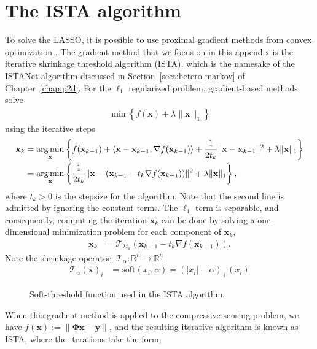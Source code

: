 \section{The ISTA algorithm}
To solve the LASSO, it is possible to use proximal gradient methods from convex optimization \cite{ref:beck2009fast}. The gradient method that we focus on in this appendix is the iterative shrinkage threshold algorithm (ISTA), which is the namesake of the ISTANet algorithm discussed in Section~\ref{sect:hetero-markov} of Chapter~\ref{chap:p2d}. For the $\ell_1$ regularized problem, gradient-based methods solve 
\begin{align*}
    \min \left\{f(\mathbf{x})+\lambda\|\mathbf{x}\|_1\right\}
\end{align*}
using the iterative steps
\begin{align*}
    \mathbf{x}_k &= \operatorname*{arg\,min}_{\mathbf{x}} \left\{f(\mathbf{x}_{k-1}) + \langle \mathbf{x} - \mathbf{x}_{k-1}, \nabla f(\mathbf{x}_{k-1}) \rangle + \frac{1}{2t_k}\|\mathbf{x} - \mathbf{x}_{k-1}\|^2 + \lambda\|\mathbf{x}\|_1\right\} \\
    &= \operatorname*{arg\,min}_{\mathbf{x}} \left\{\frac{1}{2t_k}\|\mathbf{x} - (\mathbf{x}_{k-1} - t_k\nabla f(\mathbf{x}_{k-1}))\|^2 + \lambda\|\mathbf{x}\|_1\right\},
\end{align*}
where $t_k>0$ is the stepsize for the algorithm. Note that the second line is admitted by ignoring the constant terms. The $\ell_1$ term is separable, and consequently, computing the iteration $\mathbf{x}_k$ can be done by solving a one-dimensional minimization problem for each component of $\mathbf{x}_k$,
\begin{align*}
    \mathbf{x}_k &= \mathcal{T}_{\lambda t_k} (\mathbf{x}_{k-1} - t_k\nabla f(\mathbf{x}_{k-1})).
\end{align*}
Note the shrinkage operator, $\mathcal{T}_{\alpha} : \mathbb{R}^n \to \mathbb{R}^n$,
\begin{align*}
    \mathcal{T}_{\alpha}(\mathbf{x})_i &= \text{soft}(x_i, \alpha) = (|x_i| - \alpha)_{+}(x_i)
\end{align*}
\begin{figure*}[!hbtp]
\centering
\def\svgwidth{0.8\linewidth}

\caption{Soft-threshold function used in the ISTA algorithm.}
\label{fig:soft_threshold}
\end{figure*}
When this gradient method is applied to the compressive sensing problem, we have $f(\mathbf{x}) := \|\mathbf{\Phi}\mathbf{x}-\mathbf{y}\|$, and the resulting iterative algorithm is known as ISTA, where the iterations take the form,
